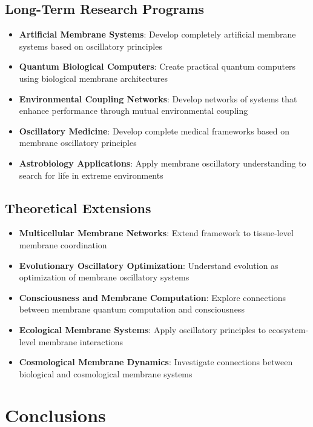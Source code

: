 \documentclass[12pt,a4paper]{article}
\begin{document}
\subsection{Long-Term Research Programs}

\begin{itemize}
\item \textbf{Artificial Membrane Systems}: Develop completely artificial membrane systems based on oscillatory principles
\item \textbf{Quantum Biological Computers}: Create practical quantum computers using biological membrane architectures
\item \textbf{Environmental Coupling Networks}: Develop networks of systems that enhance performance through mutual environmental coupling
\item \textbf{Oscillatory Medicine}: Develop complete medical frameworks based on membrane oscillatory principles
\item \textbf{Astrobiology Applications}: Apply membrane oscillatory understanding to search for life in extreme environments
\end{itemize}

\subsection{Theoretical Extensions}

\begin{itemize}
\item \textbf{Multicellular Membrane Networks}: Extend framework to tissue-level membrane coordination
\item \textbf{Evolutionary Oscillatory Optimization}: Understand evolution as optimization of membrane oscillatory systems
\item \textbf{Consciousness and Membrane Computation}: Explore connections between membrane quantum computation and consciousness
\item \textbf{Ecological Membrane Systems}: Apply oscillatory principles to ecosystem-level membrane interactions
\item \textbf{Cosmological Membrane Dynamics}: Investigate connections between biological and cosmological membrane systems
\end{itemize}

\section{Conclusions}
\end{document}
